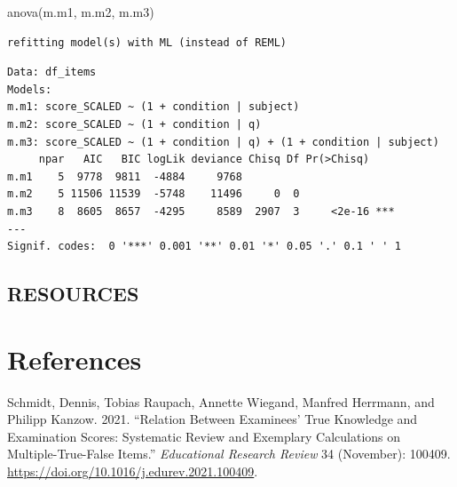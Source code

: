 \documentclass[
  letterpaper,
  DIV=11,
  numbers=noendperiod]{scrreprt}
\newenvironment{Shaded}{\begin{snugshade}}{\end{snugshade}}
\newcommand{\FunctionTok}[1]{\textcolor[rgb]{0.28,0.35,0.67}{#1}}
\newcommand{\NormalTok}[1]{\textcolor[rgb]{0.00,0.23,0.31}{#1}}
\newlength{\cslhangindent}
\newlength{\cslentryspacingunit} %
\newenvironment{CSLReferences}[2] %
 {%
  \setlength{\parindent}{0pt}
  \ifodd #1
  \let\oldpar\par
  \def\par{\hangindent=\cslhangindent\oldpar}
  \fi
  \setlength{\parskip}{#2\cslentryspacingunit}
 }%
 {}
\begin{document}
\begin{Shaded}
\begin{Highlighting}[]
\FunctionTok{anova}\NormalTok{(m.m1, m.m2, m.m3)}
\end{Highlighting}
\end{Shaded}

\begin{verbatim}
refitting model(s) with ML (instead of REML)
\end{verbatim}

\begin{verbatim}
Data: df_items
Models:
m.m1: score_SCALED ~ (1 + condition | subject)
m.m2: score_SCALED ~ (1 + condition | q)
m.m3: score_SCALED ~ (1 + condition | q) + (1 + condition | subject)
     npar   AIC   BIC logLik deviance Chisq Df Pr(>Chisq)    
m.m1    5  9778  9811  -4884     9768                        
m.m2    5 11506 11539  -5748    11496     0  0               
m.m3    8  8605  8657  -4295     8589  2907  3     <2e-16 ***
---
Signif. codes:  0 '***' 0.001 '**' 0.01 '*' 0.05 '.' 0.1 ' ' 1
\end{verbatim}

\hypertarget{resources-4}{%
\section{RESOURCES}\label{resources-4}}

\hypertarget{references}{%
\chapter*{References}\label{references}}

\hypertarget{refs}{}
\begin{CSLReferences}{1}{0}
\leavevmode{}%
Schmidt, Dennis, Tobias Raupach, Annette Wiegand, Manfred Herrmann, and
Philipp Kanzow. 2021. {``Relation Between Examinees' True Knowledge and
Examination Scores: Systematic Review and Exemplary Calculations on
{Multiple}-{True}-{False} Items.''} \emph{Educational Research Review}
34 (November): 100409.
\url{https://doi.org/10.1016/j.edurev.2021.100409}.

\end{CSLReferences}
\end{document}
